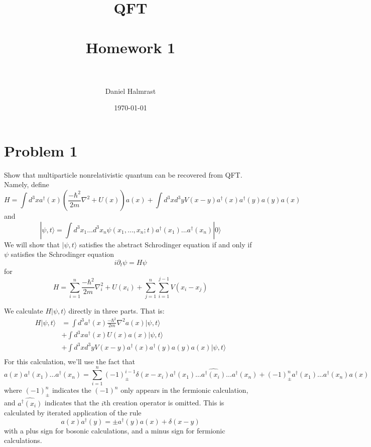 \documentclass[fontsize=11pt]{scrartcl} %
\title{	
\normalfont \normalsize 
\textsc{QFT} \\ [25pt] %
\horrule{0.5pt} \\[0.4cm] %
\huge Homework 1 \\ %
\horrule{2pt} \\[0.5cm] %
}
\author{Daniel Halmrast} %
\date{\normalsize\today} %
\numberwithin{equation}{section} %
\numberwithin{figure}{section} %
\numberwithin{table}{section} %
\newcommand{\ad}{a^{\dagger}}
\begin{document}
\maketitle %

\section*{Problem 1}
Show that multiparticle nonrelativistic quantum can be recovered from QFT.
Namely, define
\[
    H = \int d^3x\ad(x)\left( \frac{-\hbar^2}{2m}\nabla^2 + U(x)
    \right)a(x) + \int d^3xd^3yV(x-y)\ad(x)\ad(y)a(y)a(x)
\]
and
\[
    |\psi,t\rangle = \int d^3x_1\dots d^3x_n
    \psi(x_1,\dots,x_n;t)\ad(x_1)\dots\ad(x_n)|0\rangle
\]
We will show that $|\psi,t\rangle$ satisfies the abstract Schrodinger equation
if and only if $\psi$ satisfies the Schrodinger equation
\[
    i\partial_t\psi = H\psi
\]
for
\[
    H = \sum_{i=1}^n \frac{-\hbar^2}{2m}\nabla^2_i + U(x_i) +
    \sum_{j=1}^n\sum_{i=1}^{j-1}V(x_i-x_j)
\]

We calculate $H|\psi,t\rangle$ directly in three parts. That is:
\[
    \begin{aligned}
    H|\psi,t\rangle &= 
    \int d^3\ad(x)\frac{-\hbar^2}{2m}\nabla^2a(x)|\psi,t\rangle\\
        &+ \int d^3x \ad(x)U(x)a(x)|\psi,t\rangle\\
        &+ \int d^3xd^3yV(x-y)\ad(x)\ad(y)a(y)a(x)|\psi,t\rangle\\
    \end{aligned}
\]
For this calculation, we'll use the fact that
\[
    a(x)\ad(x_1)\dots\ad(x_n) =
    \sum_{i=1}^n(-1)^{i-1}_{\pm}\delta(x-x_i)\ad(x_1)\dots\hat{\ad(x_i)}\dots\ad(x_n) +
    (-1)^n_{\pm}
    \ad(x_1)\dots\ad(x_n)a(x)
\]
where $(-1)^n_{\pm}$ indicates the $(-1)^n$ only appears in the fermionic
calculation, and $\hat{\ad(x_i)}$ indicates that the $i$th creation operator is
omitted. This is calculated by iterated application of the rule
\[
    a(x)\ad(y) = \pm\ad(y)a(x) + \delta(x-y)
\]
with a plus sign for bosonic calculations, and a minus sign for fermionic
calculations.
\end{document}

